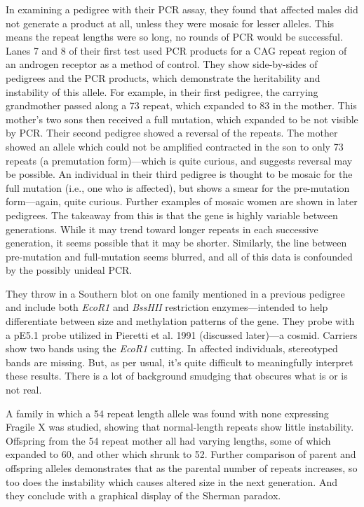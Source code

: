 In examining a pedigree with their PCR assay, they found that affected males did not generate a product at all, unless they were mosaic for lesser alleles. This means the repeat lengths were so long, no rounds of PCR would be successful. Lanes 7 and 8 of their first test used PCR products for a CAG repeat region of an androgen receptor as a method of control. They show side-by-sides of pedigrees and the PCR products, which demonstrate the heritability and instability of this allele. For example, in their first pedigree, the carrying grandmother passed along a 73 repeat, which expanded to 83 in the mother. This mother's two sons then received a full mutation, which expanded to be not visible by PCR. Their second pedigree showed a reversal of the repeats. The mother showed an allele which could not be amplified contracted in the son to only 73 repeats (a premutation form)---which is quite curious, and suggests reversal may be possible. An individual in their third pedigree is thought to be mosaic for the full mutation (i.e., one who is affected), but shows a smear for the pre-mutation form---again, quite curious. Further examples of mosaic women are shown in later pedigrees. The takeaway from this is that the gene is highly variable between generations. While it may trend toward longer repeats in each successive generation, it seems possible that it may be shorter. Similarly, the line between pre-mutation and full-mutation seems blurred, and all of this data is confounded by the possibly unideal PCR.\newline

They throw in a Southern blot on one family mentioned in a previous pedigree and include both \textit{EcoR1} and \textit{BssHII} restriction enzymes---intended to help differentiate between size and methylation patterns of the gene. They probe with a pE5.1 probe utilized in Pieretti et al. 1991 (discussed later)---a cosmid. Carriers show two bands using the \textit{EcoR1} cutting. In affected individuals, stereotyped bands are missing. But, as per usual, it's quite difficult to meaningfully interpret these results. There is a lot of background smudging that obscures what is or is not real.\newline

A family in which a 54 repeat length allele was found with none expressing Fragile X was studied, showing that normal-length repeats show little instability. Offspring from the 54 repeat mother all had varying lengths, some of which expanded to 60, and other which shrunk to 52. Further comparison of parent and offspring alleles demonstrates that as the parental number of repeats increases, so too does the instability which causes altered size in the next generation. And they conclude with a graphical display of the Sherman paradox.\newline

